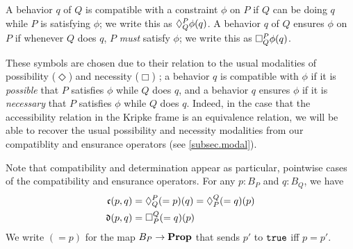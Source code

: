     A behavior $q$ of $Q$ is compatible with a constraint $\phi$ on $P$ if $Q$ can be doing $q$ while $P$ is satisfying $\phi$; we write this as $\compat{P}{Q}\phi(q)$. A behavior $q$ of $Q$ ensures $\phi$ on $P$ if whenever $Q$ does $q$, $P$ \emph{must} satisfy $\phi$; we write this as $\ensure{P}{Q}\phi(q)$.
    
    These symbols are chosen due to their relation to the usual modalities of possibility ($\Diamond$) and necessity ($\Box$) \cite{kripke1963semantical}; a behavior $q$ is compatible with $\phi$ if it is \emph{possible} that $P$ satisfies $\phi$ while $Q$ does $q$, and a behavior $q$ ensures $\phi$ if it is \emph{necessary} that $P$ satisfies $\phi$ while $Q$ does $q$. Indeed, in the case that the accessibility relation in the Kripke frame is an equivalence relation, we will be able to recover the usual possibility and necessity modalities from our compatiblity and ensurance operators (see \cref{subsec.modal}).
    
    Note that compatibility and determination appear as particular, pointwise cases of the compatibility and ensurance operators. For any $p:B_P$ and $q:B_Q$, we have
    \begin{align*}
        \mathfrak{c}(p, q) &= \compat{P}{Q}(=p)(q) = \compat{Q}{P}(=q)(p) \\
        \mathfrak{d}(p, q) &= \ensure{Q}{P}(=q)(p)
    \end{align*}
    We write $(=p)$ for the map $B_P\to\Prop$ that sends $p'$ to $\true$ iff $p=p'$.
    
